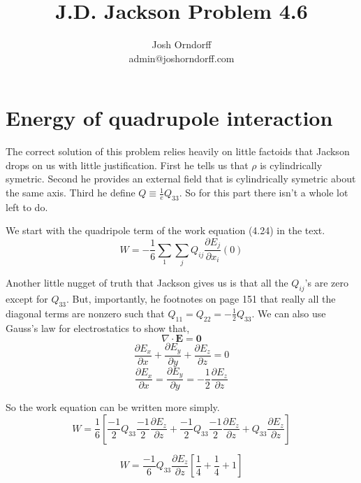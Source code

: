 \documentclass[10pt,a4paper]{article}
\begin{document}
\title{J.D. Jackson Problem 4.6}
\author{Josh Orndorff \\ admin@joshorndorff.com}
\maketitle

\section{Energy of quadrupole interaction}
The correct solution of this problem relies heavily on little factoids that Jackson drops on us with little justification.  First he tells us that $\rho$ is cylindrically symetric.  Second he provides an external field that is cylindrically symetric about the same axis.  Third he define $Q\equiv\frac{1}{e}Q_{33}$.  So for this part there isn't a whole lot left to do.

We start with the quadripole term of the work equation (4.24) in the text.
\begin{equation}
W=-\frac{1}{6}\sum_1\sum_j Q_{ij} \frac{\partial E_j}{\partial x_i}(0)
\end{equation}

Another little nugget of truth that Jackson gives us is that all the $Q_{ij}$'s are zero except for $Q_{33}$.  But, importantly, he footnotes on page 151 that really all the diagonal terms are nonzero such that $Q_{11}=Q_{22}=-\frac{1}{2}Q_{33}$.  We can also use Gauss's law for electrostatics to show that,
\begin{equation}
\nabla\cdot \mathbf{E} = \mathbf{0}
\end{equation}
\begin{equation}
\frac{\partial E_x}{\partial x} + \frac{\partial E_y}{\partial y} + \frac{\partial E_z}{\partial z} = 0
\end{equation}
\begin{equation}
\frac{\partial E_x}{\partial x} = \frac{\partial E_y}{\partial y} = -\frac{1}{2}\frac{\partial E_z}{\partial z}
\end{equation}

So the work equation can be written more simply.
\begin{equation}
W=\frac{1}{6}\left[
\frac{-1}{2}Q_{33}\frac{-1}{2}\frac{\partial E_z}{\partial z}+
\frac{-1}{2}Q_{33}\frac{-1}{2}\frac{\partial E_z}{\partial z}+
Q_{33}\frac{\partial E_z}{\partial z}
\right]
\end{equation}

\begin{equation}
W=\frac{-1}{6}Q_{33}\frac{\partial E_z}{\partial z} \left[\frac{1}{4}+\frac{1}{4}+1 \right]
\end{equation}
\end{document}
